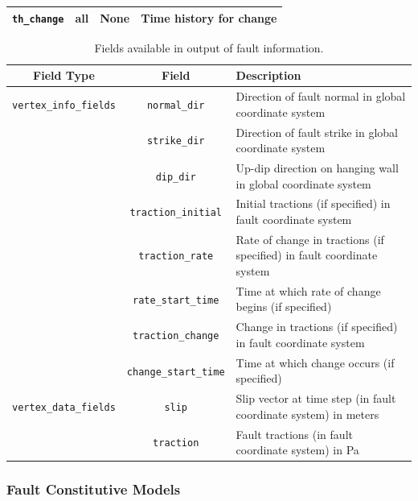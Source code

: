 \begin{center}
\begin{table}[H]
\begin{tabular}{|l|l|l|>{\raggedright}p{2.5in}|}
\hline 
\texttt{th\_change} & all & None & Time history for change\tabularnewline
\hline 
\end{tabular}
\end{table}
\begin{table}[H]
\noindent \centering{}\caption{\label{tab:fault:dyn:output}Fields available in output of fault information.}
\medskip{}
\begin{tabular}{|c|c|>{\centering}p{3.5in}|}
\hline 
\textbf{Field Type} & \textbf{Field} & \textbf{Description}\tabularnewline
\hline 
\hline 
\texttt{vertex\_info\_fields} & \texttt{normal\_dir} & \raggedright{}Direction of fault normal in global coordinate system\tabularnewline
 & \texttt{strike\_dir} & \raggedright{}Direction of fault strike in global coordinate system\tabularnewline
 & \texttt{dip\_dir} & \raggedright{}Up-dip direction on hanging wall in global coordinate
system\tabularnewline
 & \texttt{traction\_initial} & \raggedright{}Initial tractions (if specified) in fault coordinate
system\tabularnewline
 & \texttt{traction\_rate} & \raggedright{}Rate of change in tractions (if specified) in fault
coordinate system\tabularnewline
 & \texttt{rate\_start\_time} & \raggedright{}Time at which rate of change begins (if specified)\tabularnewline
 & \texttt{traction\_change} & \raggedright{}Change in tractions (if specified) in fault coordinate
system\tabularnewline
 & \texttt{change\_start\_time} & \raggedright{}Time at which change occurs (if specified)\tabularnewline
\hline 
\texttt{vertex\_data\_fields} & \texttt{slip} & \raggedright{}Slip vector at time step (in fault coordinate system)
in meters\tabularnewline
 & \texttt{traction} & \raggedright{}Fault tractions (in fault coordinate system) in Pa\tabularnewline
\hline 
\end{tabular}
\end{table}

\par\end{center}


\subsubsection{Fault Constitutive Models\label{sec:fault:constitutive:models}}

